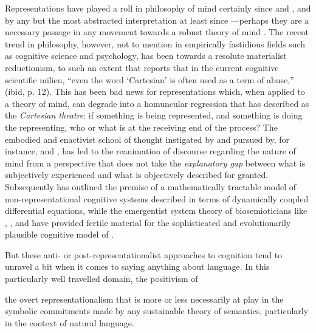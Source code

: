 Representations have played a roll in philosophy of mind certainly since \cite{Descartes1911} and \cite{Hobbes1651}, and by any but the most abstracted interpretation at least since \cite{Plato1892}---perhaps they are a necessary passage in any movement towards a robust theory of mind \citep[if, in fact, such a theory is even desirable---\emph{cf}][]{Rorty1979}.  The recent trend in philosophy, however, not to mention in empirically fastidious fields such as cognitive science and psychology, has been towards a resolute materialist reductionism, to such an extent that \cite{Rowlands2010} reports that in the current cognitive scientific milieu, ``even the word `Cartesian' is often used as a term of abuse,'' (ibid, p. 12).  This has been bad news for representations which, when applied to a theory of mind, can degrade into a homuncular regression that \cite{Dennett1991} has described as the \emph{Cartesian theatre}: if something is being represented, and something is doing the representing, who or what is at the receiving end of the process?  The embodied and enactivist school of thought instigated by \cite{MaturanaEA1987} and pursued by, for instance, \cite{Haugeland1993} and \cite{Thompson2007}, has led to the reanimation of discourse regarding the nature of mind from a perspective that does not take the \emph{explanatory gap} \citep{Levine1983} between what is subjectively experienced and what is objectively described for granted.  Subsequently \cite{VanGelder1995} has outlined the premise of a mathematically tractable model of non-representational cognitive systems described in terms of dynamically coupled differential equations, while the emergentist system theory of biosemioticians like \cite{Kauffman1995}, \cite{Hoffmeyer1997}, and \cite{Pattee2001} have provided fertile material for the sophisticated and evolutionarily plausible cognitive model of \cite{Deacon2011}.

But these anti- or post-representationalist approaches to cognition tend to unravel a bit when it comes to saying anything about language.  In this particularly well travelled domain, the positivism of \cite{Russell} 

the overt representationalism that is more or less necessarily at play in the symbolic commitments made by any sustainable theory of semantics, particularly in the context of natural language.



